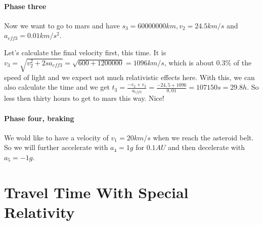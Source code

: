 \documentclass[10pt]{article}
\begin{document}
	\paragraph{Phase three}	
	Now we want to go to mars and have $s_3 = 60 000 000 km, v_2 = 24.5 km/s$ and $a_{eff3} = 0.01 km/s^2$.
	
	Let's calculate the final velocity first, this time. It is $v_3 = \sqrt{v^2_2 + 2sa_{eff3}} = \sqrt{600 + 1 200 000} = 1096 km/s$, which is about $0.3 \%$ of the speed of light and we expect not much relativistic effects here. With this, we can also calculate the time and we get $t_3 = \frac{-v_2 + v_3}{a_{eff3}} = \frac{-24,5 + 1096}{0,01} = 107150 s = 29.8 h$. So less then thirty hours to get to mars this way. Nice!
	
	\paragraph{Phase four, braking}
	
	We wold like to have a velocity of $v_1 = 20 km/s$ when we reach the asteroid belt. So we will further accelerate with $a_4 = 1 g$ for $0.1 AU$ and then decelerate with $a_5 = -1 g$.
	
	
	
	\section{Travel Time With Special Relativity}
\end{document}
